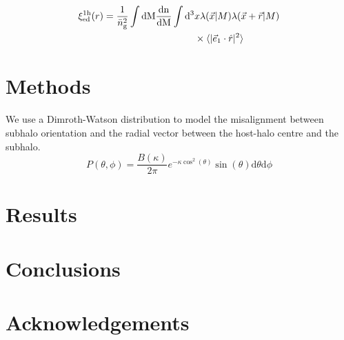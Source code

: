 \documentclass[fleqn,usenatbib]{mnras}
\newcommand{\tpcftwo}[2]{\xi_{\rm #1}^{\rm #2}}
\newcommand{\dd}{\rm d}
\newcommand{\mean}[1]{\langle #1 \rangle}
\begin{document}
\begin{align}
\begin{split}
\tpcftwo{ed}{1h}(r) =  \frac{1}{\bar{n}_{\rm g}^{2}} \int\dd M \frac{\rm dn}{\dd M} \int\dd^{3}& x\lambda(\vec{x}\vert M)\lambda(\vec{x}+\vec{r}\vert M)\\ & \times  \mean{\vert\vec{e}_{1}\cdot\hat{r}\vert^{2}}
\end{split}
\end{align}

\section{Methods}

We use a Dimroth-Watson distribution to model the misalignment between subhalo orientation and the radial vector between the host-halo centre and the subhalo.   
\begin{equation}
P(\theta,\phi) = \frac{B(\kappa)}{2\pi}e^{-\kappa\cos^2(\theta)}\sin(\theta)\mathrm{d}\theta\mathrm{d}\phi
\label{eq:watson}
\end{equation}

\section{Results}

\section{Conclusions}

\section*{Acknowledgements}










\bsp	%
\label{lastpage}
\end{document}
